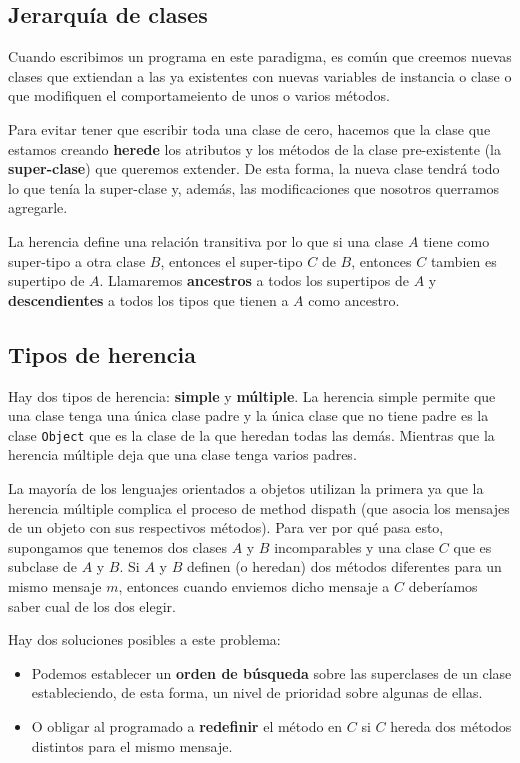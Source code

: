 \subsection{Jerarquía de clases}
Cuando escribimos un programa en este paradigma, es común que creemos nuevas clases que extiendan a las ya existentes con nuevas variables de instancia o clase o que modifiquen el comportameiento de unos o varios métodos.

Para evitar tener que escribir toda una clase de cero, hacemos que la clase que estamos creando \textbf{herede} los atributos y los métodos de la clase pre-existente (la \textbf{super-clase}) que queremos extender. De esta forma, la nueva clase tendrá todo lo que tenía la super-clase y, además, las modificaciones que nosotros querramos agregarle.

La herencia define una relación transitiva por lo que si una clase $A$ tiene como super-tipo a otra clase $B$, entonces el super-tipo $C$ de $B$, entonces $C$ tambien es supertipo de $A$. Llamaremos \textbf{ancestros} a todos los supertipos de $A$ y \textbf{descendientes} a todos los tipos que tienen a $A$ como ancestro.

\subsection{Tipos de herencia}
Hay dos tipos de herencia: \textbf{simple} y \textbf{múltiple}. La herencia simple permite que una clase tenga una única clase padre y la única clase que no tiene padre es la clase \texttt{Object} que es la clase de la que heredan todas las demás. Mientras que la herencia múltiple deja que una clase tenga varios padres.

La mayoría de los lenguajes orientados a objetos utilizan la primera ya que la herencia múltiple complica el proceso de method dispath (que asocia los mensajes de un objeto con sus respectivos métodos). Para ver por qué pasa esto, supongamos que tenemos dos clases $A$ y $B$ incomparables y una clase $C$ que es subclase de $A$ y $B$. Si $A$ y $B$ definen (o heredan) dos métodos diferentes para un mismo mensaje $m$, entonces cuando enviemos dicho mensaje a $C$ deberíamos saber cual de los dos elegir.

Hay dos soluciones posibles a este problema:
\begin{itemize}
\item Podemos establecer un \textbf{orden de búsqueda} sobre las superclases de un clase estableciendo, de esta forma, un nivel de prioridad sobre algunas de ellas.
\item O obligar al programado a \textbf{redefinir} el método en $C$ si $C$ hereda dos métodos distintos para el mismo mensaje.
\end{itemize}

